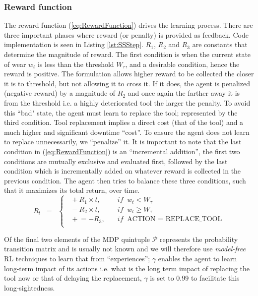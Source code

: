 \documentclass[a4paper, 12pt]{article}
\begin{document}
\subsubsection*{Reward function}
The reward function (\ref{eq:RewardFunction}) drives the learning process. There are three important phases where reward (or penalty) is provided as feedback. Code implementation is seen in Listing \ref{lst:SSStep}. $R_1$, $R_2$ and $R_3$ are constants that determine the magnitude of reward. The first condition is when the current state of wear $w_t$ is less than the threshold $W_\tau$, and a desirable condition, hence the reward is positive. The formulation allows higher reward to be collected the closer it is to threshold, but not allowing it to cross it. If it does, the agent is penalized (negative reward) by a magnitude of $R_2$ and once again the farther away it is from the threshold i.e. a highly deteriorated tool the larger the penalty. To avoid this ``bad" state, the agent must learn to replace the tool; represented by the third condition. Tool replacement implies a direct cost (that of the tool) and a much higher and significant downtime ``cost''. To ensure the agent does not learn to replace unnecessarily, we ``penalize'' it. It is important to note that the last condition in (\ref{eq:RewardFunction}) is an ``incremental addition'', the first two conditions are mutually exclusive and evaluated first, followed by the last condition which is incrementally added on whatever reward is collected in the previous condition. The agent then tries to balance these three conditions, such that it maximizes its total return, over time.
\begin{equation}
	R_t \;\;=\;\;
	\begin{cases}
		\;\;  +R_1 \times t, & \quad if \;\; w_t < W_\tau\\
		\;\;  -R_2 \times t, & \quad if \;\; w_t\ge W_\tau\\
		\;\; \mathrel{+}= -R_3, & \quad if \;\; \text{ACTION = REPLACE\_TOOL}\\
	\end{cases}
	\label{eq:RewardFunction}
\end{equation}

Of the final two elements of the MDP quintuple $\mathcal{P}$ represents the probability transition matrix and is usually not known and we will therefore use \textit{model-free} RL techniques to learn that from ``experiences''; $\gamma$ enables the agent to learn long-term impact of its actions i.e. what is the long term impact of replacing the tool now or that of delaying the replacement, $\gamma$ is set to 0.99 to facilitate this long-sightedness.
\end{document}
